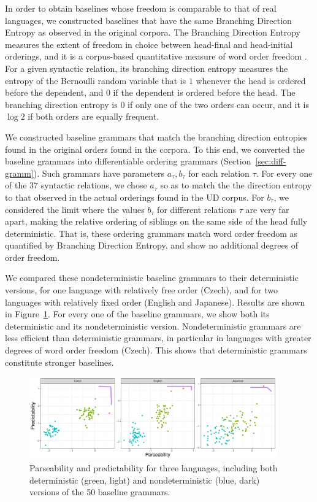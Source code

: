 \documentclass[10pt,twoside,lineno]{article}
\begin{document}
In order to obtain baselines whose freedom is comparable to that of real languages, we constructed baselines that have the same Branching Direction Entropy \cite{futrell2015quantifying} as observed in the original corpora.
The Branching Direction Entropy measures the extent of freedom in choice between head-final and head-initial orderings, and it is a corpus-based quantitative measure of word order freedom \cite{futrell2015quantifying}.
For a given syntactic relation, its branching direction entropy measures the entropy of the Bernoulli random variable that is $1$ whenever the head is ordered before the dependent, and $0$ if the dependent is ordered before the head.
The branching direction entropy is $0$ if only one of the two orders can occur, and it is $\log 2$ if both orders are equally frequent.

We constructed baseline grammars that match the branching direction entropies found in the original orders found in the corpora.
To this end, we converted the baseline grammars into differentiable ordering grammars (Section~\ref{sec:diff-gramm}).
Such grammars have parameters $a_\tau, b_\tau$ for each relation $\tau$.
For every one of the 37 syntactic relations, we chose $a_\tau$ so as to match the the direction entropy to that observed in the actual orderings found in the UD corpus.
For $b_\tau$, we considered the limit where the values $b_\tau$ for different relations $\tau$ are very far apart, making the relative ordering of siblings on the same side of the head fully deterministic.
That is, these ordering grammars match word order freedom as quantified by Branching Direction Entropy, and show no additional degrees of order freedom.

We compared these nondeterministic baseline grammars to their deterministic versions, for one language with relatively free order (Czech), and for two languages with relatively fixed order (English and Japanese).
Results are shown in Figure~\ref{fig:nondeterministic}.
For every one of the baseline grammars, we show both its deterministic and its nondeterministic version.
Nondeterministic grammars are less efficient than deterministic grammars, in particular in languages with greater degrees of word order freedom (Czech).
This shows that deterministic grammars constitute stronger baselines.

\begin{figure}
	\centering
	\includegraphics[width=0.95\textwidth]{../results/plane/nondeterministic/pareto-plane-perLanguage-nondeterministic-mle.pdf}
	\caption{Parseability and predictability for three languages, including both deterministic (green, light) and nondeterministic  (blue, dark) versions of the 50 baseline grammars.}\label{fig:nondeterministic}
\end{figure}
\end{document}
